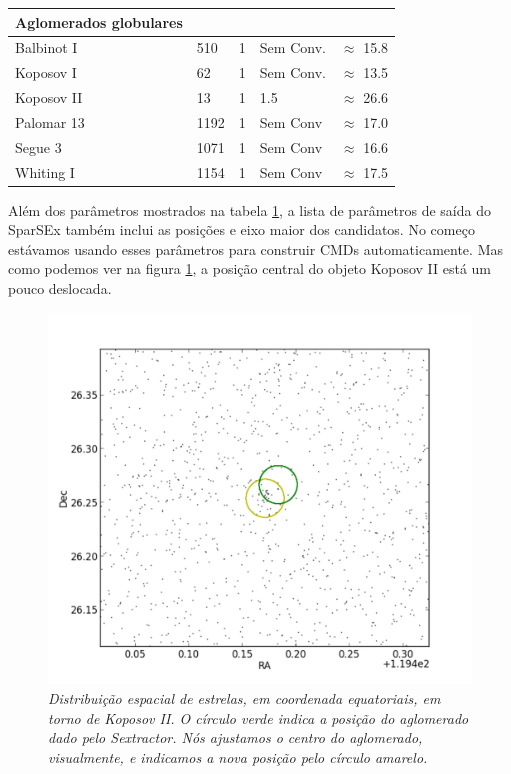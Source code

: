 \documentclass[
	12pt,				%
	openany,			%
	oneside,			%
	a4paper,			%
	english,			%
	brazil				%
	]{abntex2}
\begin{document}
\begin{table}[h]
\begin{tabular}{p{3.0cm}p{2.0cm}p{2.5cm}p{2.8cm}p{2.8cm}}
\hline
Aglomerados globulares \\
\hline
\hline
Balbinot I & 510 & 1 & Sem Conv. & $\approx$ 15.8 \\
Koposov I & 62 & 1 & Sem Conv. & $\approx$ 13.5 \\
Koposov II & 13 & 1 & 1.5 & $\approx$ 26.6 \\
Palomar 13 & 1192 & 1 & Sem Conv & $\approx$ 17.0 \\
Segue 3 & 1071 & 1 & Sem Conv & $\approx$ 16.6 \\
Whiting I & 1154 & 1 & Sem Conv & $\approx$ 17.5 \\
\hline
\end{tabular}
\label{tab:3}
\end{table}

Além dos parâmetros mostrados na tabela \ref{tab:3}, a lista de parâmetros de saída do SparSEx também inclui as posições e eixo maior dos candidatos. No começo estávamos usando esses parâmetros para construir CMDs  automaticamente. Mas como podemos ver na figura \ref{fig:central}, a posição central do objeto Koposov II está um pouco deslocada. 

\begin{figure}[h]
\begin{center}
\includegraphics[width=12cm]{figuras/center.pdf}
\caption{\textit{Distribuição espacial de estrelas, em coordenada equatoriais, em torno de Koposov II. O círculo verde indica a posição do aglomerado dado pelo Sextractor. Nós ajustamos o centro do aglomerado, visualmente, e indicamos a nova posição pelo círculo amarelo. }}
\label{fig:central}
\end{center}
\end{figure}
\vspace{0.5cm}
\end{document}
